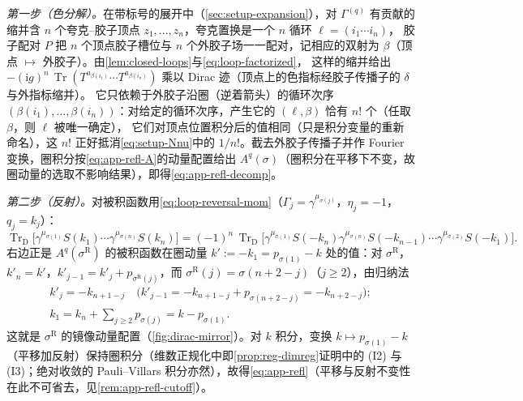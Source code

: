 \documentclass[UTF8,a4paper,11pt,fontset=fandol]{ctexart}
\makeatletter
\theoremstyle{cplain}
\theoremstyle{cdefinition}
\theoremstyle{cremark}
\renewcommand{\proofname}{证明}
\renewenvironment{proof}[1][\proofname]{\par\pushQED{\qed}\normalfont\topsep6\p@\@plus6\p@\relax
  \trivlist\item[\hskip\labelsep\itshape #1\hspace{0.5em}]\ignorespaces}{\popQED\endtrivlist\@endpefalse}
\numberwithin{equation}{section}
\DeclareMathOperator{\Tr}{Tr}
\newcommand{\TrD}{\operatorname{Tr}_{\mathrm{D}}}   %
\newcommand{\ii}{\mathrm{i}}                        %
\makeatother
\begin{document}
\begin{proof}
\emph{第一步（色分解）。}在带标号的展开中（\cref{sec:setup-expansion}），对 $\Gamma^{(q)}$ 有贡献的缩并含 $n$ 个夸克--胶子顶点 $z_1,\dots,z_n$，夸克置换是一个 $n$ 循环 $\ell=(i_1\cdots i_n)$，
胶子配对 $P$ 把 $n$ 个顶点胶子槽位与 $n$ 个外胶子场一一配对，记相应的双射为 $\beta$（顶点 $\mapsto$ 外胶子）。由\cref{lem:closed-loops}与\cref{eq:loop-factorized}，
这样的缩并给出 $-(\ii g)^n\,\Tr(T^{a_{\beta(i_1)}}\cdots T^{a_{\beta(i_n)}})$ 乘以 Dirac 迹（顶点上的色指标经胶子传播子的 $\delta$ 与外指标缩并）。
它只依赖于外胶子沿圈（逆着箭头）的循环次序 $(\beta(i_1),\dots,\beta(i_n))$：对给定的循环次序，产生它的 $(\ell,\beta)$ 恰有 $n!$ 个（任取 $\beta$，则 $\ell$ 被唯一确定），
它们对顶点位置积分后的值相同（只是积分变量的重新命名），这 $n!$ 正好抵消\cref{eq:setup-Nnu}中的 $1/n!$。截去外胶子传播子并作 Fourier 变换，圈积分按\cref{eq:app-refl-A}的动量配置给出 $A^q(\sigma)$（圈积分在平移下不变，故圈动量的选取不影响结果），即得\cref{eq:app-refl-decomp}。

\emph{第二步（反射）。}对被积函数用\cref{eq:loop-reversal-mom}（$\Gamma_j=\gamma^{\mu_{\sigma(j)}}$，$\eta_j=-1$，$q_j=k_j$）：
\begin{equation*}
\TrD\bigl[\gamma^{\mu_{\sigma(1)}}S(k_1)\cdots\gamma^{\mu_{\sigma(n)}}S(k_n)\bigr]=(-1)^n\,\TrD\bigl[\gamma^{\mu_{\sigma(1)}}S(-k_n)\gamma^{\mu_{\sigma(n)}}S(-k_{n-1})\cdots\gamma^{\mu_{\sigma(2)}}S(-k_1)\bigr].
\end{equation*}
右边正是 $A^q(\sigma^{\mathrm R})$ 的被积函数在圈动量 $k':=-k_1=p_{\sigma(1)}-k$ 处的值：对 $\sigma^{\mathrm R}$，$k'_n=k'$，$k'_{j-1}=k'_j+p_{\sigma^{\mathrm R}(j)}$，而 $\sigma^{\mathrm R}(j)=\sigma(n+2-j)$（$j\ge2$），由归纳法
\begin{gather*}
k'_j=-k_{n+1-j}\quad\bigl(k'_{j-1}=-k_{n+1-j}+p_{\sigma(n+2-j)}=-k_{n+2-j}\bigr);\\
k_1=k_n+\textstyle\sum_{j\ge2}p_{\sigma(j)}=k-p_{\sigma(1)}.
\end{gather*}
这就是 $\sigma^{\mathrm R}$ 的镜像动量配置（\cref{fig:dirac-mirror}）。对 $k$ 积分，变换 $k\mapsto p_{\sigma(1)}-k$（平移加反射）保持圈积分（维数正规化中即\cref{prop:reg-dimreg}证明中的 (I2) 与 (I3)；绝对收敛的 Pauli--Villars 积分亦然），故得\cref{eq:app-refl}（平移与反射不变性在此不可省去，见\cref{rem:app-refl-cutoff}）。


\end{proof}
\end{document}
